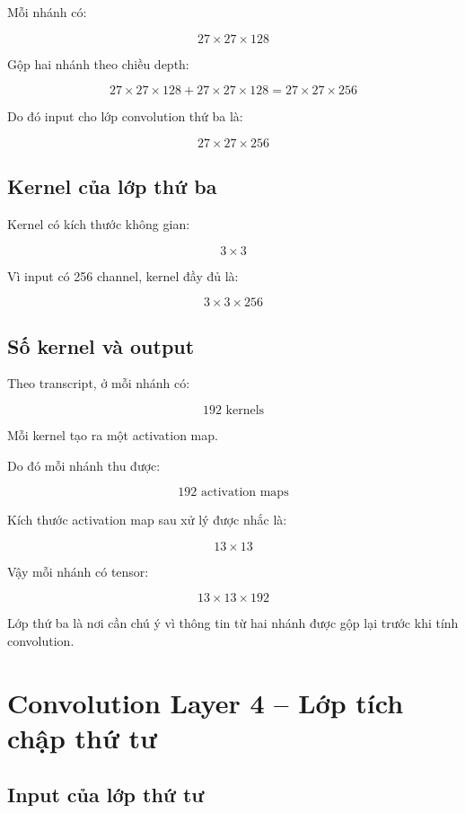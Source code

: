 Mỗi nhánh có:

\[
    27\times27\times128
\]

Gộp hai nhánh theo chiều depth:

\[
    27\times27\times128
    +
    27\times27\times128
    =
    27\times27\times256
\]

Do đó input cho lớp convolution thứ ba là:

\[
    27\times27\times256
\]

\subsection{Kernel của lớp thứ ba}

Kernel có kích thước không gian:

\[
    3\times3
\]

Vì input có 256 channel, kernel đầy đủ là:

\[
    3\times3\times256
\]

\subsection{Số kernel và output}

Theo transcript, ở mỗi nhánh có:

\[
    192 \text{ kernels}
\]

Mỗi kernel tạo ra một activation map.

Do đó mỗi nhánh thu được:

\[
    192 \text{ activation maps}
\]

Kích thước activation map sau xử lý được nhắc là:

\[
    13\times13
\]

Vậy mỗi nhánh có tensor:

\[
    13\times13\times192
\]

\begin{ghinho}
Lớp thứ ba là nơi cần chú ý vì thông tin từ hai nhánh được gộp lại trước khi tính convolution.
\end{ghinho}

\section{Convolution Layer 4 -- Lớp tích chập thứ tư}

\subsection{Input của lớp thứ tư}

